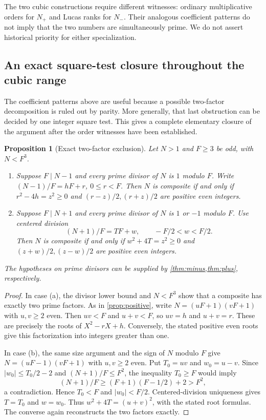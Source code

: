 \documentclass[11pt,a4paper]{article}
\newtheorem{proposition}[theorem]{Proposition}
\theoremstyle{definition}\newtheorem{definition}[theorem]{Definition}
\theoremstyle{remark}\newtheorem{remark}[theorem]{Remark}
\begin{document}
The two cubic constructions require different witnesses: ordinary
multiplicative orders for $N_+$ and Lucas ranks for $N_-$. Their analogous
coefficient patterns do not imply that the two numbers are simultaneously
prime. We do not assert historical priority for either specialization.

\subsection{An exact square-test closure throughout the cubic range}

The coefficient patterns above are useful because a possible two-factor
decomposition is ruled out by parity. More generally, that last obstruction
can be decided by one integer square test. This gives a complete elementary
closure of the argument after the order witnesses have been established.

\begin{proposition}[Exact two-factor exclusion]\label{prop:square-closure}
Let $N>1$ and $F\ge3$ be odd, with $N<F^3$.
\begin{enumerate}[label=\textup{(\alph*)}]
\item Suppose $F\mid N-1$ and every prime divisor of $N$ is $1$ modulo $F$.
Write $(N-1)/F=hF+r$, $0\le r<F$. Then $N$ is composite if and only if
$r^2-4h=z^2\ge0$ and $(r-z)/2,(r+z)/2$ are positive even integers.
\item Suppose $F\mid N+1$ and every prime divisor of $N$ is $1$ or $-1$
modulo $F$. Use centered division
\[
 (N+1)/F=TF+w,\qquad -F/2<w<F/2.
\]
Then $N$ is composite if and only if $w^2+4T=z^2\ge0$ and
$(z+w)/2,(z-w)/2$ are positive even integers.
\end{enumerate}
The hypotheses on prime divisors can be supplied by
\cref{thm:minus,thm:plus}, respectively.
\end{proposition}

\begin{proof}
In case (a), the divisor lower bound and $N<F^3$ show that a composite has
exactly two prime factors. As in \cref{prop:positive}, write
$N=(uF+1)(vF+1)$ with $u,v\ge2$ even. Then $uv<F$ and $u+v<F$, so
$uv=h$ and $u+v=r$. These are precisely the roots of $X^2-rX+h$.
Conversely, the stated positive even roots give this factorization into
integers greater than one.

In case (b), the same size argument and the sign of $N$ modulo $F$ give
$N=(uF-1)(vF+1)$ with $u,v\ge2$ even. Put $T_0=uv$ and $w_0=u-v$.
Since $|w_0|\le T_0/2-2$ and $(N+1)/F\le F^2$, the inequality
$T_0\ge F$ would imply
\[
 (N+1)/F\ge(F+1)(F-1/2)+2>F^2,
\]
a contradiction. Hence $T_0<F$ and $|w_0|<F/2$. Centered-division uniqueness
gives $T=T_0$ and $w=w_0$. Thus $w^2+4T=(u+v)^2$, with the stated root
formulas. The converse again reconstructs the two factors exactly.
\end{proof}
\end{document}
